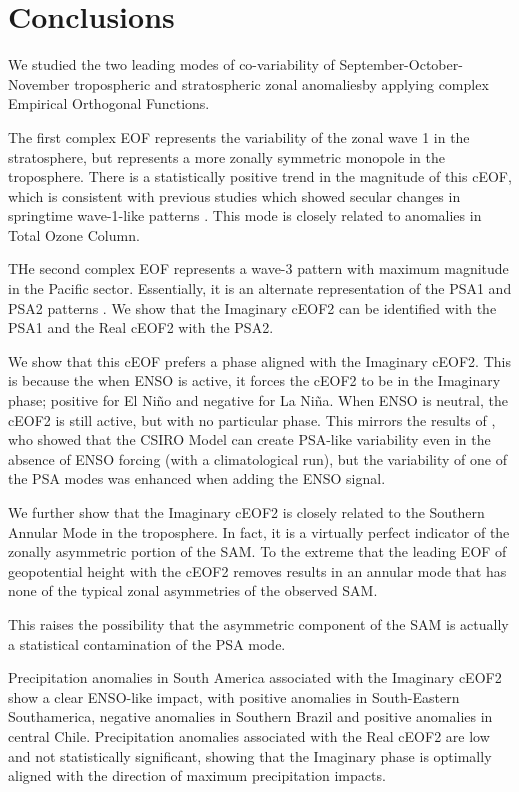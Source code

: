\documentclass[smallextended]{svjour3}       %
\begin{document}
\hypertarget{conclusions}{%
\section{Conclusions}\label{conclusions}}

We studied the two leading modes of co-variability of September-October-November tropospheric and stratospheric zonal anomaliesby applying complex Empirical Orthogonal Functions.

The first complex EOF represents the variability of the zonal wave 1 in the stratosphere, but represents a more zonally symmetric monopole in the troposphere. There is a statistically positive trend in the magnitude of this cEOF, which is consistent with previous studies which showed secular changes in springtime wave-1-like patterns \citep[e.g.][]{raphael2003}. This mode is closely related to anomalies in Total Ozone Column.

THe second complex EOF represents a wave-3 pattern with maximum magnitude in the Pacific sector. Essentially, it is an alternate representation of the PSA1 and PSA2 patterns \citep{mo2001}. We show that the Imaginary cEOF2 can be identified with the PSA1 and the Real cEOF2 with the PSA2.

We show that this cEOF prefers a phase aligned with the Imaginary cEOF2. This is because the when ENSO is active, it forces the cEOF2 to be in the Imaginary phase; positive for El Niño and negative for La Niña. When ENSO is neutral, the cEOF2 is still active, but with no particular phase. This mirrors the results of \citet{cai2002}, who showed that the CSIRO Model can create PSA-like variability even in the absence of ENSO forcing (with a climatological run), but the variability of one of the PSA modes was enhanced when adding the ENSO signal.

We further show that the Imaginary cEOF2 is closely related to the Southern Annular Mode in the troposphere. In fact, it is a virtually perfect indicator of the zonally asymmetric portion of the SAM. To the extreme that the leading EOF of geopotential height with the cEOF2 removes results in an annular mode that has none of the typical zonal asymmetries of the observed SAM.

This raises the possibility that the asymmetric component of the SAM is actually a statistical contamination of the PSA mode.

Precipitation anomalies in South America associated with the Imaginary cEOF2 show a clear ENSO-like impact, with positive anomalies in South-Eastern Southamerica, negative anomalies in Southern Brazil and positive anomalies in central Chile. Precipitation anomalies associated with the Real cEOF2 are low and not statistically significant, showing that the Imaginary phase is optimally aligned with the direction of maximum precipitation impacts.
\end{document}
